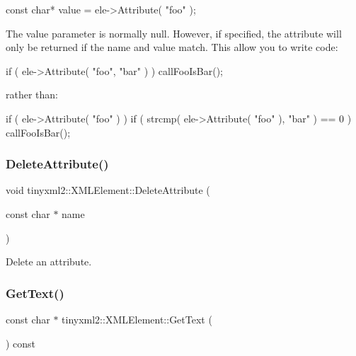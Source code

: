 \begin{DoxyVerb}const char* value = ele->Attribute( "foo" );
\end{DoxyVerb}


The \textquotesingle{}value\textquotesingle{} parameter is normally null. However, if specified, the attribute will only be returned if the \textquotesingle{}name\textquotesingle{} and \textquotesingle{}value\textquotesingle{} match. This allow you to write code\+:

\begin{DoxyVerb}if ( ele->Attribute( "foo", "bar" ) ) callFooIsBar();
\end{DoxyVerb}


rather than\+: \begin{DoxyVerb}if ( ele->Attribute( "foo" ) ) {
    if ( strcmp( ele->Attribute( "foo" ), "bar" ) == 0 ) callFooIsBar();
}
\end{DoxyVerb}
 \mbox{\label{classtinyxml2_1_1_x_m_l_element_aebd45aa7118964c30b32fe12e944628a}} 
\subsubsection{\texorpdfstring{Delete\+Attribute()}{DeleteAttribute()}}
{\footnotesize\ttfamily void tinyxml2\+::\+X\+M\+L\+Element\+::\+Delete\+Attribute (\begin{DoxyParamCaption}\item[{const char $\ast$}]{name }\end{DoxyParamCaption})}

Delete an attribute. \mbox{\label{classtinyxml2_1_1_x_m_l_element_a0fa5bea0a4daf3ddd503dcabb823eba6}} 
\subsubsection{\texorpdfstring{Get\+Text()}{GetText()}}
{\footnotesize\ttfamily const char $\ast$ tinyxml2\+::\+X\+M\+L\+Element\+::\+Get\+Text (\begin{DoxyParamCaption}{ }\end{DoxyParamCaption}) const}


